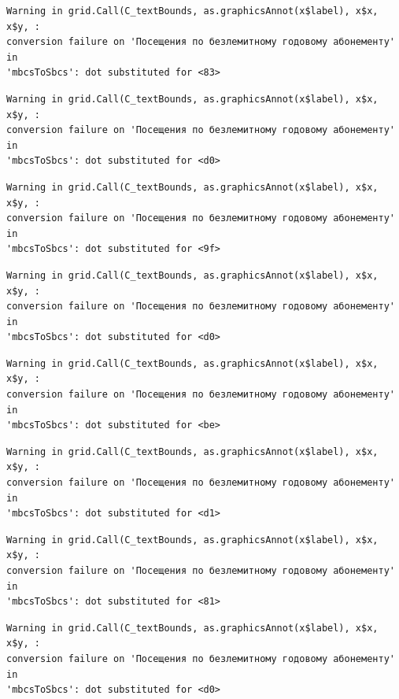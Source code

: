 \documentclass[
  letterpaper,
  DIV=11,
  numbers=noendperiod]{scrartcl}
\begin{document}
\begin{verbatim}
Warning in grid.Call(C_textBounds, as.graphicsAnnot(x$label), x$x, x$y, :
conversion failure on 'Посещения по безлемитному годовому абонементу' in
'mbcsToSbcs': dot substituted for <83>
\end{verbatim}

\begin{verbatim}
Warning in grid.Call(C_textBounds, as.graphicsAnnot(x$label), x$x, x$y, :
conversion failure on 'Посещения по безлемитному годовому абонементу' in
'mbcsToSbcs': dot substituted for <d0>
\end{verbatim}

\begin{verbatim}
Warning in grid.Call(C_textBounds, as.graphicsAnnot(x$label), x$x, x$y, :
conversion failure on 'Посещения по безлемитному годовому абонементу' in
'mbcsToSbcs': dot substituted for <9f>
\end{verbatim}

\begin{verbatim}
Warning in grid.Call(C_textBounds, as.graphicsAnnot(x$label), x$x, x$y, :
conversion failure on 'Посещения по безлемитному годовому абонементу' in
'mbcsToSbcs': dot substituted for <d0>
\end{verbatim}

\begin{verbatim}
Warning in grid.Call(C_textBounds, as.graphicsAnnot(x$label), x$x, x$y, :
conversion failure on 'Посещения по безлемитному годовому абонементу' in
'mbcsToSbcs': dot substituted for <be>
\end{verbatim}

\begin{verbatim}
Warning in grid.Call(C_textBounds, as.graphicsAnnot(x$label), x$x, x$y, :
conversion failure on 'Посещения по безлемитному годовому абонементу' in
'mbcsToSbcs': dot substituted for <d1>
\end{verbatim}

\begin{verbatim}
Warning in grid.Call(C_textBounds, as.graphicsAnnot(x$label), x$x, x$y, :
conversion failure on 'Посещения по безлемитному годовому абонементу' in
'mbcsToSbcs': dot substituted for <81>
\end{verbatim}

\begin{verbatim}
Warning in grid.Call(C_textBounds, as.graphicsAnnot(x$label), x$x, x$y, :
conversion failure on 'Посещения по безлемитному годовому абонементу' in
'mbcsToSbcs': dot substituted for <d0>
\end{verbatim}
\end{document}
